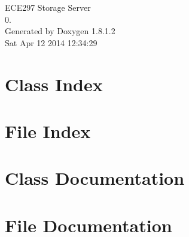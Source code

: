 \documentclass{book}
\begin{document}
\hypersetup{pageanchor=false,citecolor=blue}
\begin{titlepage}
\vspace*{7cm}
\begin{center}
{\Large E\-C\-E297 Storage Server \\[1ex]\large 0. }\\
\vspace*{1cm}
{\large Generated by Doxygen 1.8.1.2}\\
\vspace*{0.5cm}
{\small Sat Apr 12 2014 12:34:29}\\
\end{center}
\end{titlepage}
\clearemptydoublepage
{}
\tableofcontents
\clearemptydoublepage
{}
\hypersetup{pageanchor=true,citecolor=blue}
\chapter{Class Index}

\chapter{File Index}

\chapter{Class Documentation}








\chapter{File Documentation}






\printindex
\end{document}
